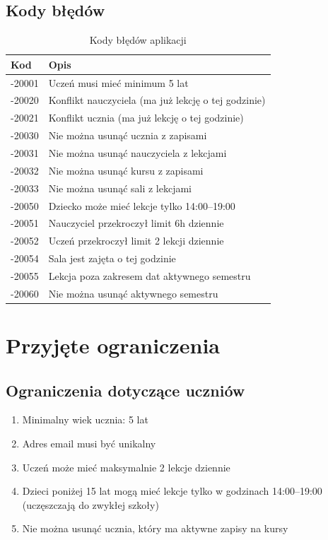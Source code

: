 \documentclass[12pt,a4paper]{article}
\begin{document}
\subsection{Kody błędów}
\begin{table}[h]
\centering
\begin{tabular}{|l|p{8cm}|}
\hline
\textbf{Kod} & \textbf{Opis} \\
\hline
-20001 & Uczeń musi mieć minimum 5 lat \\
-20020 & Konflikt nauczyciela (ma już lekcję o tej godzinie) \\
-20021 & Konflikt ucznia (ma już lekcję o tej godzinie) \\
-20030 & Nie można usunąć ucznia z zapisami \\
-20031 & Nie można usunąć nauczyciela z lekcjami \\
-20032 & Nie można usunąć kursu z zapisami \\
-20033 & Nie można usunąć sali z lekcjami \\
-20050 & Dziecko może mieć lekcje tylko 14:00--19:00 \\
-20051 & Nauczyciel przekroczył limit 6h dziennie \\
-20052 & Uczeń przekroczył limit 2 lekcji dziennie \\
-20054 & Sala jest zajęta o tej godzinie \\
-20055 & Lekcja poza zakresem dat aktywnego semestru \\
-20060 & Nie można usunąć aktywnego semestru \\
\hline
\end{tabular}
\caption{Kody błędów aplikacji}
\end{table}

\section{Przyjęte ograniczenia}

\subsection{Ograniczenia dotyczące uczniów}
\begin{enumerate}[nosep]
    \item Minimalny wiek ucznia: 5 lat
    \item Adres email musi być unikalny
    \item Uczeń może mieć maksymalnie 2 lekcje dziennie
    \item Dzieci poniżej 15 lat mogą mieć lekcje tylko w godzinach 14:00--19:00 (uczęszczają do zwykłej szkoły)
    \item Nie można usunąć ucznia, który ma aktywne zapisy na kursy
\end{enumerate}
\end{document}
